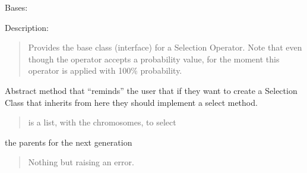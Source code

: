 \documentclass[letterpaper,10pt,english]{sphinxmanual}
\begin{document}
\begin{fulllineitems}
\label{\detokenize{pygenalgo.operators.selection:pygenalgo.operators.selection.select_operator.SelectionOperator}}
\pysigstartsignatures
\pysiglinewithargsret
{}
{}
{}
\pysigstopsignatures
\sphinxAtStartPar
Bases: {\hyperref[\detokenize{pygenalgo.operators:pygenalgo.operators.genetic_operator.GeneticOperator}]{}}

\sphinxAtStartPar
Description:
\begin{quote}

\sphinxAtStartPar
Provides the base class (interface) for a Selection Operator.  Note that even
though the operator accepts a probability value, for the moment this operator
is applied with 100\% probability.
\end{quote}

\begin{fulllineitems}
\label{\detokenize{pygenalgo.operators.selection:pygenalgo.operators.selection.select_operator.SelectionOperator.select}}
\pysigstartsignatures
\pysiglinewithargsret
{}
{}
{}
\pysigstopsignatures
\sphinxAtStartPar
Abstract method that “reminds” the user that if they want to
create a Selection Class that inherits from here they should
implement a select method.
\begin{quote}\begin{description}
\sphinxAtStartPar
{} \textendash{} is a list, with the chromosomes, to select

\end{description}\end{quote}

\sphinxAtStartPar
the parents for the next generation
\begin{quote}\begin{description}
\sphinxAtStartPar
Nothing but raising an error.

\end{description}\end{quote}

\end{fulllineitems}


\end{fulllineitems}
\end{document}
